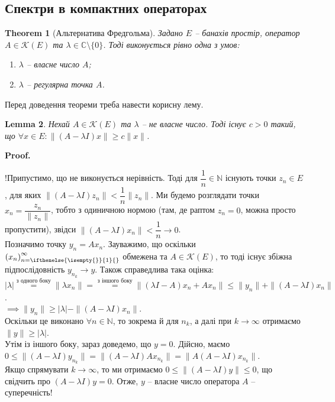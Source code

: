 \documentclass[a4paper, 10pt]{article}
\makeatletter
\theoremstyle{theoremdd}
\newtheorem{theorem}{Theorem}[subsection]
\theoremstyle{theoremdd}
\theoremstyle{theoremdd}
\theoremstyle{theoremdd}
\theoremstyle{theoremdd}
\theoremstyle{theoremdd}
\theoremstyle{theoremdd}
\newtheorem{lemma}[theorem]{Lemma}
\theoremstyle{theoremdd}
\newcommand{\sequence}[2][]{\left({#2}\right)_{n=\ifthenelse{\isempty{#1}}{1}{#1}}^{\infty}}
\renewenvironment{proof}[1][Proof.\\]{\par
\pushQED{\hfill \qed}%
\normalfont \topsep6\p@\@plus6\p@\relax
\trivlist
\item\relax
{\bfseries
#1\@addpunct{.}}\hspace\labelsep\ignorespaces
}{%
\popQED\endtrivlist\@endpefalse
}
\makeatother
\begin{document}
\subsection{Спектри в компактних операторах}
\begin{theorem}[Альтернатива Фредгольма]
Задано $E$ -- банахів простір, оператор $A \in \mathcal{K}(E)$ та $\lambda \in \mathbb{C} \setminus \{0\}$. Тоді виконується рівно одна з умов:
\begin{enumerate}[nosep,wide=0pt,label={\arabic*)}]
\item $\lambda$ -- власне число $A$;
\item $\lambda$ -- регулярна точка $A$.
\end{enumerate}
\end{theorem}

Перед доведення теореми треба навести корисну лему.
\begin{lemma}
Нехай $A \in \mathcal{K}(E)$ та $\lambda$ -- не власне число. Тоді існує $c > 0$ такий, що $\forall x \in E: \|(A-\lambda I)x\| \geq c\|x\|$.
\end{lemma}

\begin{proof}
!Припустимо, що не виконується нерівність. Тоді для $\dfrac{1}{n} \in \mathbb{N}$ існують точки $z_n \in E$, для яких $\| (A-\lambda I)z_n \| < \dfrac{1}{n}\|z_n\|$. Ми будемо розглядати точки $x_n = \dfrac{z_n}{\|z_n\|}$, тобто з одиничною нормою (там, де раптом $z_n = 0$, можна просто пропустити), звідси $\|(A-\lambda I)x_n\| < \dfrac{1}{n} \to 0$.\\
Позначимо точку $y_n = Ax_n$. Зауважимо, що оскільки $\sequence{x_n}$ обмежена та $A \in \mathcal{K}(E)$, то тоді існує збіжна підпослідовність $y_{n_k} \to y$. Також справедлива така оцінка:\\
$|\lambda| \overset{\text{з одного боку}}{=} \| \lambda x_n\| = \overset{\text{з іншого боку}}{=} \| (\lambda I-A)x_n + Ax_n \| \leq \|y_n\| + \|(A-\lambda I)x_n\|$.\\
$\implies \|y_n\| \geq |\lambda| - \|(A-\lambda I)x_n\|$.\\
Оскільки це виконано $\forall n \in \mathbb{N}$, то зокрема й для $n_k$, а далі при $k \to \infty$ отримаємо $\|y\| \geq |\lambda|$.\\
Утім із іншого боку, зараз доведемо, що $y = 0$. Дійсно, маємо\\
$0 \leq \|(A-\lambda I)y_{n_k} \| = \|(A-\lambda I) A x_{n_k}\| = \|A(A-\lambda I)x_{n_k}\|$.\\
Якщо спрямувати $k \to \infty$, то ми отримаємо $0 \leq \|(A-\lambda I)y\| \leq 0$, що свідчить про $(A-\lambda I)y = 0$. Отже, $y$ -- власне число оператора $A$ -- суперечність!
\end{proof}
\end{document}
